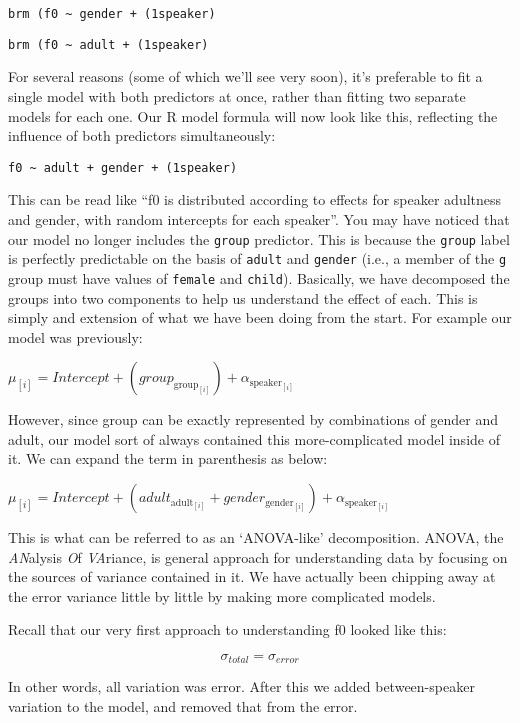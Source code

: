\documentclass[
]{book}
\begin{document}
\texttt{brm\ (f0\ \textasciitilde{}\ gender\ +\ (1\textbar{}speaker)}

\texttt{brm\ (f0\ \textasciitilde{}\ adult\ +\ (1\textbar{}speaker)}

For several reasons (some of which we'll see very soon), it's preferable to fit a single model with both predictors at once, rather than fitting two separate models for each one. Our R model formula will now look like this, reflecting the influence of both predictors simultaneously:

\texttt{f0\ \textasciitilde{}\ adult\ +\ gender\ +\ (1\textbar{}speaker)}

This can be read like ``f0 is distributed according to effects for speaker adultness and gender, with random intercepts for each speaker''. You may have noticed that our model no longer includes the \texttt{group} predictor. This is because the \texttt{group} label is perfectly predictable on the basis of \texttt{adult} and \texttt{gender} (i.e., a member of the \texttt{g} group must have values of \texttt{female} and \texttt{child}). Basically, we have decomposed the groups into two components to help us understand the effect of each. This is simply and extension of what we have been doing from the start. For example our model was previously:

\(\mu_{[i]} = Intercept + (group_{\mathrm{group}_{[i]}}) + \alpha_{\mathrm{speaker}_{[i]}}\)

However, since group can be exactly represented by combinations of gender and adult, our model sort of always contained this more-complicated model inside of it. We can expand the term in parenthesis as below:

\(\mu_{[i]} = Intercept + (adult_{\mathrm{adult}_{[i]}} + gender_{\mathrm{gender}_{[i]}}) + \alpha_{\mathrm{speaker}_{[i]}}\)

This is what can be referred to as an `ANOVA-like' decomposition. ANOVA, the \emph{AN}alysis \emph{O}f \emph{VA}riance, is general approach for understanding data by focusing on the sources of variance contained in it. We have actually been chipping away at the error variance little by little by making more complicated models.

Recall that our very first approach to understanding f0 looked like this:

\[
\sigma_{total} = \sigma_{error}
\]

In other words, all variation was error. After this we added between-speaker variation to the model, and removed that from the error.
\end{document}

